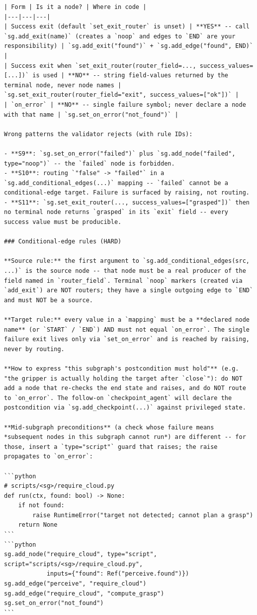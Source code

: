 \begin{lstlisting}
| Form | Is it a node? | Where in code |
|---|---|---|
| Success exit (default `set_exit_router` is unset) | **YES** -- call `sg.add_exit(name)` (creates a `noop` and edges to `END` are your responsibility) | `sg.add_exit("found")` + `sg.add_edge("found", END)` |
| Success exit when `set_exit_router(router_field=..., success_values=[...])` is used | **NO** -- string field-values returned by the terminal node, never node names | `sg.set_exit_router(router_field="exit", success_values=["ok"])` |
| `on_error` | **NO** -- single failure symbol; never declare a node with that name | `sg.set_on_error("not_found")` |

Wrong patterns the validator rejects (with rule IDs):

- **S9**: `sg.set_on_error("failed")` plus `sg.add_node("failed", type="noop")` -- the `failed` node is forbidden.
- **S10**: routing `"false" -> "failed"` in a `sg.add_conditional_edges(...)` mapping -- `failed` cannot be a conditional-edge target. Failure is surfaced by raising, not routing.
- **S11**: `sg.set_exit_router(..., success_values=["grasped"])` then no terminal node returns `grasped` in its `exit` field -- every success value must be producible.

### Conditional-edge rules (HARD)

**Source rule:** the first argument to `sg.add_conditional_edges(src, ...)` is the source node -- that node must be a real producer of the field named in `router_field`. Terminal `noop` markers (created via `add_exit`) are NOT routers; they have a single outgoing edge to `END` and must NOT be a source.

**Target rule:** every value in a `mapping` must be a **declared node name** (or `START` / `END`) AND must not equal `on_error`. The single failure exit lives only via `set_on_error` and is reached by raising, never by routing.

**How to express "this subgraph's postcondition must hold"** (e.g. "the gripper is actually holding the target after `close`"): do NOT add a node that re-checks the end state and raises, and do NOT route to `on_error`. The follow-on `checkpoint_agent` will declare the postcondition via `sg.add_checkpoint(...)` against privileged state.

**Mid-subgraph preconditions** (a check whose failure means *subsequent nodes in this subgraph cannot run*) are different -- for those, insert a `type="script"` guard that raises; the raise propagates to `on_error`:

```python
# scripts/<sg>/require_cloud.py
def run(ctx, found: bool) -> None:
    if not found:
        raise RuntimeError("target not detected; cannot plan a grasp")
    return None
```
```python
sg.add_node("require_cloud", type="script", script="scripts/<sg>/require_cloud.py",
            inputs={"found": Ref("perceive.found")})
sg.add_edge("perceive", "require_cloud")
sg.add_edge("require_cloud", "compute_grasp")
sg.set_on_error("not_found")
```


\end{lstlisting}
